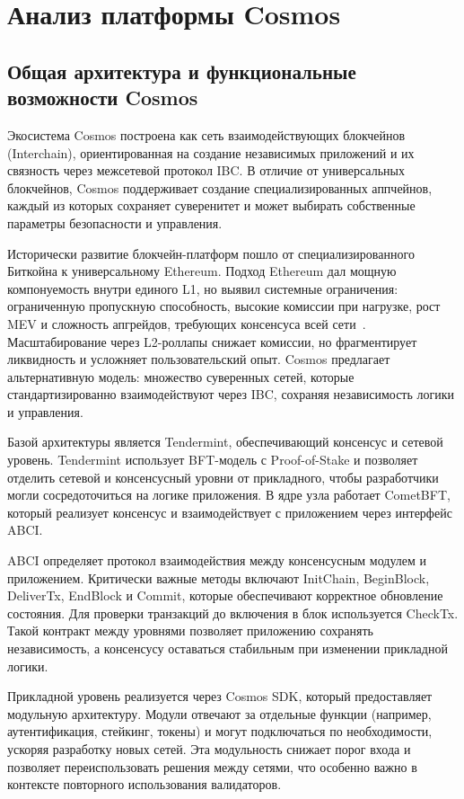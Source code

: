 \chapter{Анализ платформы Cosmos}\label{ch:ch2}

\section{Общая архитектура и функциональные возможности Cosmos}\label{sec:ch2/sec1}

Экосистема Cosmos построена как сеть взаимодействующих блокчейнов (Interchain),
ориентированная на создание независимых приложений и их связность через
межсетевой протокол IBC. В отличие от универсальных блокчейнов, Cosmos
поддерживает создание специализированных аппчейнов, каждый из которых сохраняет
суверенитет и может выбирать собственные параметры безопасности и управления.

Исторически развитие блокчейн-платформ пошло от специализированного Биткойна к
универсальному Ethereum. Подход Ethereum дал мощную компонуемость внутри единого
L1, но выявил системные ограничения: ограниченную пропускную способность,
высокие комиссии при нагрузке, рост MEV и сложность апгрейдов, требующих
консенсуса всей сети~\cite{Wood2014,Zhou2019}. Масштабирование через L2-роллапы
снижает комиссии, но фрагментирует ликвидность и усложняет пользовательский опыт.
Cosmos предлагает альтернативную модель: множество суверенных сетей, которые
стандартизированно взаимодействуют через IBC, сохраняя независимость логики и
управления.

Базой архитектуры является Tendermint, обеспечивающий консенсус и сетевой уровень.
Tendermint использует BFT-модель с Proof-of-Stake и позволяет отделить сетевой и
консенсусный уровни от прикладного, чтобы разработчики могли сосредоточиться на
логике приложения. В ядре узла работает CometBFT, который реализует консенсус и
взаимодействует с приложением через интерфейс ABCI.
~\cite{Kwon2014}

ABCI определяет протокол взаимодействия между консенсусным модулем и приложением.
Критически важные методы включают InitChain, BeginBlock, DeliverTx, EndBlock и
Commit, которые обеспечивают корректное обновление состояния. Для проверки
транзакций до включения в блок используется CheckTx. Такой контракт между
уровнями позволяет приложению сохранять независимость, а консенсусу оставаться
стабильным при изменении прикладной логики.

Прикладной уровень реализуется через Cosmos SDK, который предоставляет модульную
архитектуру. Модули отвечают за отдельные функции (например, аутентификация,
стейкинг, токены) и могут подключаться по необходимости, ускоряя разработку
новых сетей. Эта модульность снижает порог входа и позволяет переиспользовать
решения между сетями, что особенно важно в контексте повторного использования
валидаторов.

